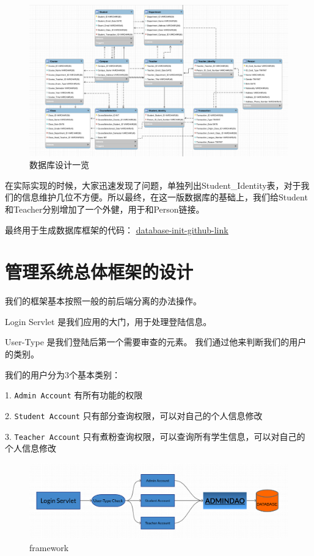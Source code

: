 \documentclass[../report.tex]{subfiles}
\begin{document}
\begin{figure}[H]
\centering
\includegraphics[width=1\linewidth]{../figure/database-design.png}
\caption{数据库设计一览}
\label{fig:database-design}
\end{figure}

在实际实现的时候，大家迅速发现了问题，单独列出Student\_Identity表，对于我们的信息维护几位不方便。所以最终，在这一版数据库的基础上，我们给Student和Teacher分别增加了一个外健，用于和Person链接。

最终用于生成数据库框架的代码：
\href{https://github.com/KradNosnatef/996_SQL/blob/master/src/main/resources/sql_init.sql}{\underline{database-init-github-link}}

\section{管理系统总体框架的设计}

我们的框架基本按照一般的前后端分离的办法操作。

Login Servlet 是我们应用的大门，用于处理登陆信息。

User-Type 是我们登陆后第一个需要审查的元素。 我们通过他来判断我们的用户的类别。

我们的用户分为3个基本类别：

1. \texttt{Admin Account} 有所有功能的权限

2. \texttt{Student Account} 只有部分查询权限，可以对自己的个人信息修改

3. \texttt{Teacher Account} 只有煮粉查询权限，可以查询所有学生信息，可以对自己的个人信息修改

\begin{figure}[H]
\centering
\includegraphics[width=1.1\linewidth]{figure/framework}
\caption{framework}
\label{fig:untitledpage}
\end{figure}
\end{document}
